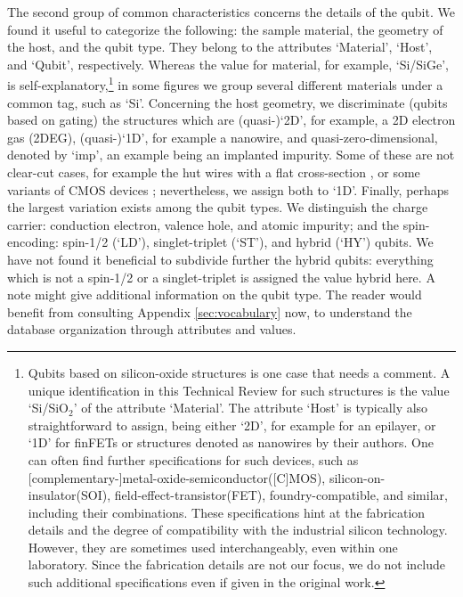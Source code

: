 \documentclass[aps, prx, showpacs, twocolumn, superscriptaddress, notitlepage, longbibliography, floatfix, nofootinbib]{revtex4-2}
\newcommand{\myKey}[1]{$\whitearrowupfrombar$\textit{#1}}
\renewcommand{\myKey}[1]{\textit{#1}}
\renewcommand{\myKey}[1]{`{#1}'}
\begin{document}
The second group of common characteristics concerns the details of the qubit. We found it useful to categorize the following: the sample material, the geometry of the host, and the qubit type. They belong to the attributes \myKey{Material}, \myKey{Host}, and \myKey{Qubit}, respectively. Whereas the value for material, for example, \myKey{Si/SiGe}, is self-explanatory,\footnote{Qubits based on silicon-oxide structures is one case that needs a comment. A unique identification in this Technical Review for such structures is the value \myKey{Si/SiO$_2$} of the attribute \myKey{Material}. The attribute \myKey{Host} is typically also straightforward to assign, being either \myKey{2D}, for example for an epilayer, or \myKey{1D} for finFETs or structures denoted as nanowires by their authors. One can often find further specifications for such devices, such as [complementary-]metal-oxide-semiconductor([C]MOS), silicon-on-insulator(SOI), field-effect-transistor(FET), foundry-compatible, and similar, including their combinations. These specifications hint at the fabrication details and the degree of compatibility with the industrial silicon technology. However, they are sometimes used interchangeably, even within one laboratory. Since the fabrication details are not our focus, we do not include such additional specifications even if given in the original work.}
 in some figures we group several different materials under a common tag, such as \myKey{Si}. Concerning the host geometry, we discriminate (qubits based on gating) the structures which are (quasi-)\myKey{2D}, for example, a 2D electron gas (2DEG), (quasi-)\myKey{1D}, for example a nanowire, and quasi-zero-dimensional, denoted by \myKey{imp}, an example being an implanted impurity. Some of these are not clear-cut cases, for example the hut wires with a flat cross-section \cite{watzinger_heavy-hole_2016}, or some variants of CMOS devices \cite{voisin_electrical_2016}; nevertheless, we assign both to \myKey{1D}. Finally, perhaps the largest variation exists among the qubit types. We distinguish the charge carrier: conduction electron, valence hole, and atomic impurity; and the spin-encoding: spin-1/2 (\myKey{LD}), singlet-triplet (\myKey{ST}), and hybrid (\myKey{HY}) qubits. We have not found it beneficial to subdivide further the hybrid qubits: everything which is not a spin-1/2 or a singlet-triplet is assigned the value hybrid here. A note might give additional information on the qubit type. The reader would benefit from consulting Appendix \ref{sec:vocabulary} now, to understand the database organization through attributes and values.
\end{document}
